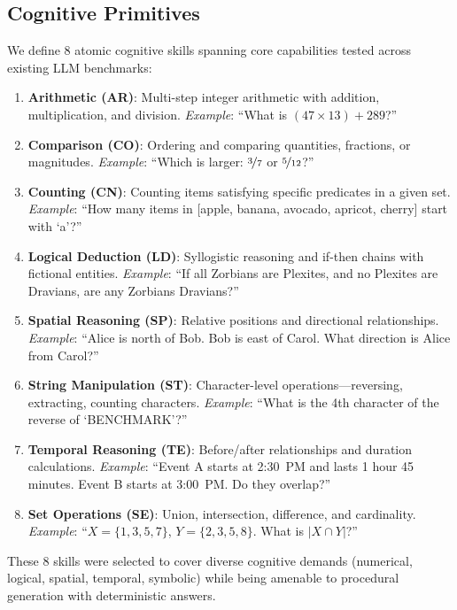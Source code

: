 \documentclass{article}
\begin{document}
\subsection{Cognitive Primitives}
\label{sec:primitives}

We define 8 atomic cognitive skills spanning core capabilities tested across existing LLM benchmarks:

\begin{enumerate}
    \item \textbf{Arithmetic (AR)}: Multi-step integer arithmetic with addition, multiplication, and division. \emph{Example}: ``What is $(47 \times 13) + 289$?''
    \item \textbf{Comparison (CO)}: Ordering and comparing quantities, fractions, or magnitudes. \emph{Example}: ``Which is larger: $\nicefrac{3}{7}$ or $\nicefrac{5}{12}$?''
    \item \textbf{Counting (CN)}: Counting items satisfying specific predicates in a given set. \emph{Example}: ``How many items in [apple, banana, avocado, apricot, cherry] start with `a'?''
    \item \textbf{Logical Deduction (LD)}: Syllogistic reasoning and if-then chains with fictional entities. \emph{Example}: ``If all Zorbians are Plexites, and no Plexites are Dravians, are any Zorbians Dravians?''
    \item \textbf{Spatial Reasoning (SP)}: Relative positions and directional relationships. \emph{Example}: ``Alice is north of Bob. Bob is east of Carol. What direction is Alice from Carol?''
    \item \textbf{String Manipulation (ST)}: Character-level operations---reversing, extracting, counting characters. \emph{Example}: ``What is the 4th character of the reverse of `BENCHMARK'?''
    \item \textbf{Temporal Reasoning (TE)}: Before/after relationships and duration calculations. \emph{Example}: ``Event A starts at 2:30~PM and lasts 1 hour 45 minutes. Event B starts at 3:00~PM. Do they overlap?''
    \item \textbf{Set Operations (SE)}: Union, intersection, difference, and cardinality. \emph{Example}: ``$X = \{1,3,5,7\}$, $Y = \{2,3,5,8\}$. What is $|X \cap Y|$?''
\end{enumerate}

These 8 skills were selected to cover diverse cognitive demands (numerical, logical, spatial, temporal, symbolic) while being amenable to procedural generation with deterministic answers.
\end{document}
